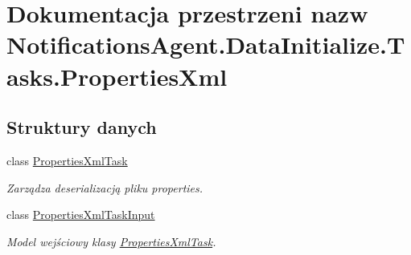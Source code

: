 \hypertarget{a00301}{}\section{Dokumentacja przestrzeni nazw Notifications\+Agent.\+Data\+Initialize.\+Tasks.\+Properties\+Xml}
\label{a00301}
\subsection*{Struktury danych}
\begin{DoxyCompactItemize}
\item 
class \hyperlink{a00043}{Properties\+Xml\+Task}
\begin{DoxyCompactList}\small\item\em Zarządza deserializacją pliku properties. \end{DoxyCompactList}\item 
class \hyperlink{a00044}{Properties\+Xml\+Task\+Input}
\begin{DoxyCompactList}\small\item\em Model wejściowy klasy \hyperlink{a00043}{Properties\+Xml\+Task}. \end{DoxyCompactList}\end{DoxyCompactItemize}
